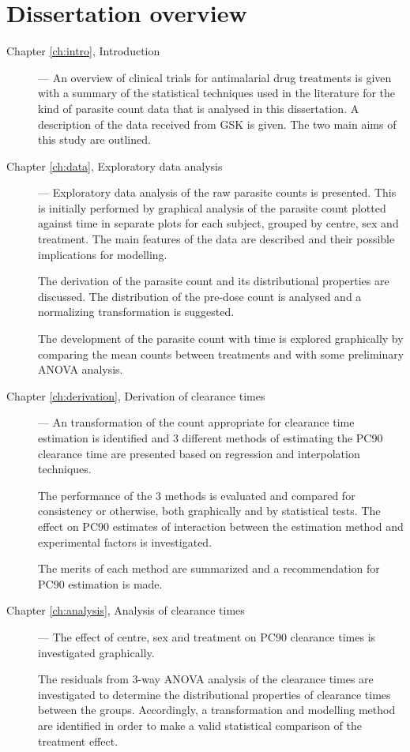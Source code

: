 \section{Dissertation overview}
\begin{description}
\item[Chapter \ref{ch:intro}, Introduction] --- An overview of clinical trials for antimalarial drug treatments is given with a summary of the statistical techniques used in the literature for the kind of parasite count data that is analysed in this dissertation. A description of the data received from GSK is given. The two main aims of this study are outlined.
\item[Chapter \ref{ch:data}, Exploratory data analysis] --- Exploratory data analysis of the raw parasite counts is presented. This is initially performed by graphical analysis of the parasite count plotted against time in separate plots for each subject, grouped by centre, sex and treatment. The main features of the data are described and their possible implications for modelling.

The derivation of the parasite count and its distributional properties are discussed. The distribution of the pre-dose count is analysed and a normalizing transformation is suggested.

The development of the parasite count with time is explored graphically by comparing the mean counts between treatments and with some preliminary ANOVA analysis.
\item[Chapter \ref{ch:derivation}, Derivation of clearance times] --- An transformation of the count appropriate for clearance time estimation is identified and 3 different methods of estimating the PC90 clearance time are presented based on regression and interpolation techniques.

The performance of the 3 methods is evaluated and compared for consistency or otherwise, both graphically and by statistical tests. The effect on PC90 estimates of interaction between the estimation method and experimental factors is investigated.

The merits of each method are summarized and a recommendation for PC90 estimation is made.
\item[Chapter \ref{ch:analysis}, Analysis of clearance times] --- The effect of centre, sex and treatment on PC90 clearance times is investigated graphically.

The residuals from 3-way ANOVA analysis of the clearance times are investigated to determine the distributional properties of clearance times between the groups. Accordingly, a transformation and modelling method are identified in order to make a valid statistical comparison of the treatment effect.


\end{description}
